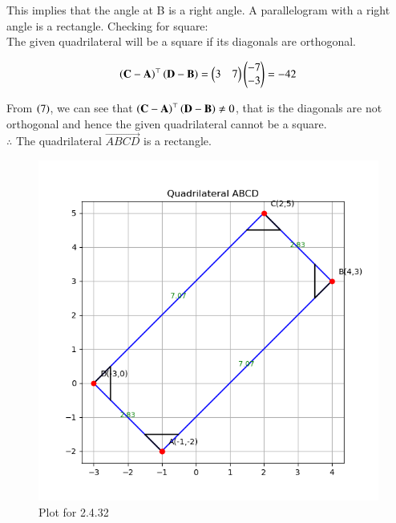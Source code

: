 \documentclass[journal,12pt,onecolumn]{IEEEtran}
\theoremstyle{remark}
\begin{document}
This implies that the angle at B is a right angle. A parallelogram with a right angle is a rectangle.
Checking for square:\\
The given quadrilateral will be a square if its diagonals are orthogonal.

\begin{equation}
    \left(\mathbf{C}-\mathbf{A}\right)^{\top}\left(\mathbf{D}-\mathbf{B}\right) = \begin{pmatrix}3&7\end{pmatrix}\begin{pmatrix}-7\\-3\end{pmatrix} = -42
\end{equation}

From $\left(7\right)$, we can see that $\left(\mathbf{C}-\mathbf{A}\right)^{\top}\left(\mathbf{D}-\mathbf{B}\right) \neq 0$, that is the diagonals are not orthogonal and hence the given quadrilateral cannot be a square.\\

$\therefore$ The quadrilateral $\vec{ABCD}$ is a rectangle.

\begin{figure}[H]
    \centering
    \includegraphics[width=1\columnwidth]{figs/1.png}
    \caption{Plot for 2.4.32}
    \label{fig:placeholder}
\end{figure}
\end{document}
